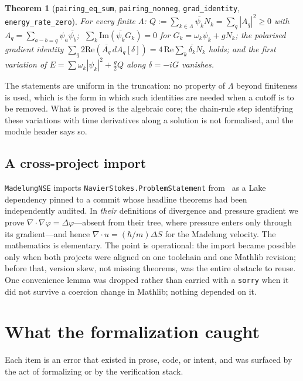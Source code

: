 \documentclass[11pt,a4paper]{article}
\newtheorem{theorem}{Theorem}
\theoremstyle{definition}
\newcommand{\conj}[1]{\overline{#1}}
\newcommand{\lean}[1]{\texttt{\small #1}}
\begin{document}
\begin{theorem}[\lean{pairing\_eq\_sum}, \lean{pairing\_nonneg}, \lean{grad\_identity},
\lean{energy\_rate\_zero}]
For every finite $\Lambda$: $Q:=\sum_{k\in\Lambda}\conj{\psi_k}N_k=\sum_q|A_q|^2\ge0$ with
$A_q=\sum_{a-b=q}\psi_a\conj{\psi_b}$; $\;\sum_k\mathrm{Im}(\conj{\psi_k}G_k)=0$ for
$G_k=\omega_k\psi_k+gN_k$; the polarised gradient identity
$\sum_q 2\mathrm{Re}(\conj{A_q}\,dA_q[\delta]) = 4\,\mathrm{Re}\sum_k\conj{\delta_k}N_k$
holds; and the first variation of $E=\sum\omega_k|\psi_k|^2+\tfrac g2Q$ along $\delta=-iG$
vanishes.
\end{theorem}
The statements are uniform in the truncation: no property of $\Lambda$ beyond finiteness is
used, which is the form in which such identities are needed when a cutoff is to be removed.
What is proved is the algebraic core; the chain-rule step identifying these variations with
time derivatives along a solution is not formalised, and the module header says so.

\subsection{A cross-project import}

\lean{MadelungNSE} imports \lean{NavierStokes.ProblemStatement} from~\cite{OpenAINSE} as a
Lake dependency pinned to a commit whose headline theorems had been independently audited.
In \emph{their} definitions of divergence and pressure gradient we prove
$\nabla\!\cdot\!\nabla\varphi=\Delta\varphi$---absent from their tree, where pressure enters
only through its gradient---and hence $\nabla\!\cdot u=(\hbar/m)\Delta S$ for the Madelung
velocity. The mathematics is elementary. The point is operational: the import became
possible only when both projects were aligned on one toolchain and one Mathlib revision;
before that, version skew, not missing theorems, was the entire obstacle to reuse. One
convenience lemma was dropped rather than carried with a \lean{sorry} when it did not
survive a coercion change in Mathlib; nothing depended on it.

\section{What the formalization caught}
\label{sec:caught}

Each item is an error that existed in prose, code, or intent, and was surfaced by the act of
formalizing or by the verification stack.
\end{document}
